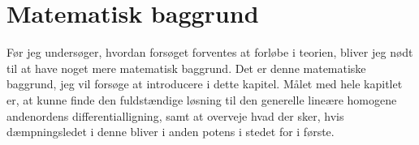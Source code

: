 \chapter{Matematisk baggrund}
Før jeg undersøger, hvordan forsøget forventes at forløbe i teorien, bliver jeg nødt til at have noget mere matematisk baggrund. 
Det er denne matematiske baggrund, jeg vil forsøge at introducere i dette kapitel. 
Målet med hele kapitlet er, at kunne finde den fuldstændige løsning til den generelle lineære homogene andenordens differentialligning, samt at overveje hvad der sker, hvis dæmpningsledet i denne bliver i anden potens i stedet for i første. 